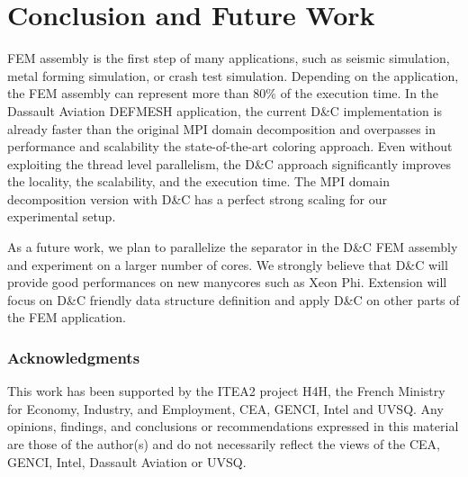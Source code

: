 \documentclass[10pt]{IOS-Book-Article}
\begin{document}

\section{Conclusion and Future Work}
\label{sec:conc}
FEM assembly is the first step of many applications, such as seismic simulation, metal forming simulation, or crash test simulation.
Depending on the application, the FEM assembly can represent more than 80\% of the execution time.
In the Dassault Aviation DEFMESH application, the current D\&C implementation is already faster than the original MPI domain decomposition and overpasses in performance and scalability the state-of-the-art coloring approach.
Even without exploiting the thread level parallelism, the D\&C approach significantly improves the locality, the scalability, and the execution time.
The MPI domain decomposition version with D\&C has a perfect strong scaling for our experimental setup.

As a future work, we plan to parallelize the separator in the D\&C FEM assembly and experiment on a larger number of cores.
We strongly believe that D\&C will provide good performances on new manycores such as Xeon Phi.
Extension will focus on D\&C friendly data structure definition and apply D\&C on other parts of the FEM application. 

\subsubsection*{Acknowledgments} \scriptsize{
This work has been supported by the ITEA2 project H4H, the French Ministry for Economy,
Industry, and Employment, CEA, GENCI, Intel and UVSQ.  Any opinions,
findings, and conclusions or recommendations expressed in this
material are those of the author(s) and do not necessarily reflect the
views of the CEA, GENCI, Intel, Dassault Aviation or UVSQ.}



\end{document}
